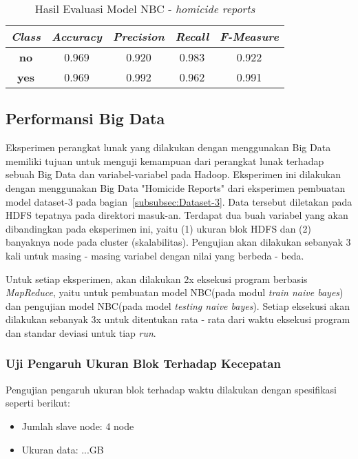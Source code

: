 \begin{table}[H]
\label{tab:model evaluation - homicide}
\centering
\caption{Hasil Evaluasi Model NBC - \textit{homicide reports}}
\begin{tabular}{ | c | c | c | c | c | }
\hline
\textit{\textbf{Class}} & \textit{\textbf{Accuracy}} & \textit{\textbf{Precision}} & \textit{\textbf{Recall}} & \textit{\textbf{F-Measure}}\\ \hline \hline
\textbf{no} & 0.969 & 0.920 & 0.983 & 0.922 \\ \hline
\textbf{yes} & 0.969 & 0.992 & 0.962 & 0.991 \\ \hline
\end{tabular}
\end{table}

\subsection{Performansi Big Data}
Eksperimen perangkat lunak yang dilakukan dengan menggunakan Big Data memiliki tujuan untuk menguji kemampuan dari perangkat lunak terhadap sebuah Big Data dan variabel-variabel pada Hadoop. Eksperimen ini dilakukan dengan menggunakan Big Data "Homicide Reports" dari eksperimen pembuatan model dataset-3 pada bagian~\ref{subsubsec:Dataset-3}. Data tersebut diletakan pada HDFS tepatnya pada direktori masuk-an. Terdapat dua buah variabel yang akan dibandingkan pada eksperimen ini, yaitu (1) ukuran blok HDFS dan (2) banyaknya node pada cluster (skalabilitas). Pengujian akan dilakukan sebanyak 3 kali untuk masing - masing variabel dengan nilai yang berbeda - beda.

Untuk setiap eksperimen, akan dilakukan 2x eksekusi program berbasis \textit{MapReduce}, yaitu untuk pembuatan model NBC(pada modul \textit{train naive bayes}) dan pengujian model NBC(pada model \textit{testing naive bayes}). Setiap eksekusi akan dilakukan sebanyak 3x untuk ditentukan rata - rata dari waktu eksekusi program dan standar deviasi untuk tiap \textit{run}.

\subsubsection{Uji Pengaruh Ukuran Blok Terhadap Kecepatan}

Pengujian pengaruh ukuran blok terhadap waktu dilakukan dengan spesifikasi seperti berikut:

\begin{itemize}
	\item Jumlah slave node: 4 node
	\item Ukuran data: ...GB
\end{itemize}

